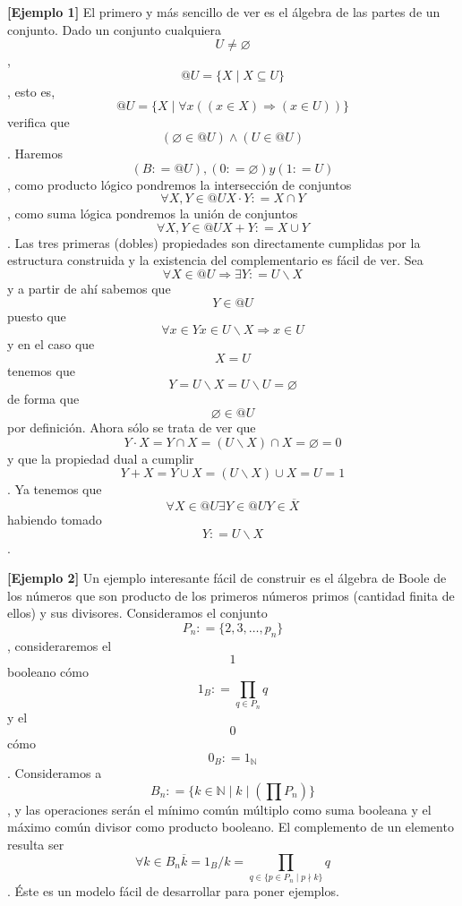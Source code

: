 \begin{enumerate}
  \textbf{{[}Ejemplo 1{]} }El primero y más sencillo de ver es el
  álgebra de las partes de un conjunto. Dado un conjunto
  cualquiera\[U \neq \varnothing\],
  \[{@U} = {\{{X \mid {X \subseteq U}}\}}\], esto es,
  \[{@U} = {\{{X \mid {{\forall x}\left( {{({x \in X})}\Rightarrow{({x \in U})}} \right)}}\}}\]
  verifica
  que\[\left( {{\varnothing \in @}U} \right) \land \left( {{U \in @}U} \right)\].
  Ha\-remos\[\left( {B{: = @}U} \right),\left( {0{: = \varnothing}} \right)y\left( {1{: = U}} \right)\],
  como producto lógico pondremos la intersección de
  conjuntos\[\forall X,{Y \in @}U{X \cdot Y}{: = {X \cap Y}}\], como
  suma lógica pondremos la unión de
  conjuntos\[\forall X,{Y \in @}U{X + Y}{: = {X \cup Y}}\]. Las tres
  primeras (dobles) propiedades son di\-rectamente cumplidas por la
  estructura construida y la existencia del complementario es fá\-cil de
  ver. Sea
  \[\forall{X \in @}U\Rightarrow\exists Y{: = {U \smallsetminus X}}\]y a
  partir de ahí sabemos que\[{Y \in @}U\]puesto
  que\[\forall{x \in Y}{x \in {U \smallsetminus X}}\Rightarrow{x \in U}\]y
  en el caso que\[X = U\]tenemos que
  \[{{Y = {U \smallsetminus X}} = {U \smallsetminus U}} = \varnothing\]de
  forma que\[{\varnothing \in @}U\]por definición. Ahora sólo se trata
  de ver
  que\[{{{{Y \cdot X} = {Y \cap X}} = {{({U \smallsetminus X})} \cap X}} = \varnothing} = 0\]y
  que la propiedad dual a
  cumplir\[{{{{Y + X} = {Y \cup X}} = {{({U \smallsetminus X})} \cup X}} = U} = 1\].
  Ya tenemos
  que\[\forall{X \in @}U\exists{Y \in @}U{Y \in \overline{X}}\]ha\-biendo
  tomado\[Y{: = {U \smallsetminus X}}\].

  \textbf{{[}Ejemplo 2{]}} Un ejemplo interesante fácil de construir es
  el álgebra de Boole de los números que son producto de los primeros
  núme\-ros primos (cantidad finita de ellos) y sus divisores.
  Consideramos el conjunto \[P_{n}{: = {\{{2,3,\ldots,p_{n}}\}}}\],
  con\-sideraremos el \[1\] booleano
  cómo\[1_{B}{: = {\prod\limits_{q \in P_{n}}q}}\]y el \[0\]
  cómo\[0_{B}{: = 1_{\mathbb{N}}}\]. Consideramos a
  \[B_{n}{: = {\{{{k \in \mathbb{N}} \mid {k \mid \left( {\prod P_{n}} \right)}}\}}}\],
  y las operaciones serán el mínimo común múltiplo como suma booleana y
  el máximo común divisor como producto booleano. El complemento de un
  ele\-mento resulta ser
  \[\forall{k \in B_{n}}{{\overline{k} = {1_{B}/k}} = {\prod\limits_{q \in {\{{{{p \in P_{n}} \mid p} \nmid k}\}}}q}}\].
  Éste es un modelo fácil de desarrollar para poner ejemplos.


\end{enumerate}
